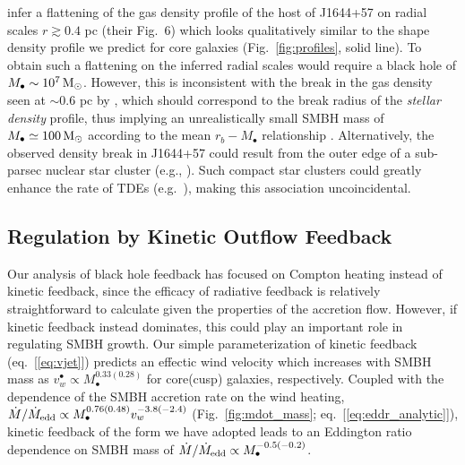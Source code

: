 \documentclass[usenatbib,fleqn]{mn2e}
\newcommand{\Mbh}[1][]{M_{\bullet#1}}
\begin{document}
\citet{BergerZauderer+:2012a} infer a flattening of the gas density
profile of the host of J1644+57 on radial scales $r \gtrsim 0.4$ pc (their Fig.~6) which looks
qualitatively similar to the shape density profile we predict for core
galaxies (Fig.~\ref{fig:profiles}, solid line).  To obtain such a flattening on the inferred radial scales would require a black hole of $\Mbh\sim 10^7 \Msun$.  However,  this is inconsistent with the break in the gas density seen at $\sim 0.6$ pc by \citet{BergerZauderer+:2012a}, which should correspond to the break radius of the {\it stellar density} profile, thus implying an unrealistically small SMBH mass of $\Mbh\simeq 100\Msun$ according to the mean $r_b-M_{\bullet}$ relationship \citep{LauerFaber+:2007a}.  Alternatively, the observed density break in J1644+57 could result from the outer edge of a sub-parsec nuclear star cluster (e.g., \citealt{Carson+15}).  Such compact star clusters could greatly enhance the rate of TDEs (e.g.~\citealt{Stone&Metzger15}), making this association uncoincidental.


\subsection{Regulation by Kinetic Outflow Feedback}
\label{sec:kinetic}

Our analysis of black hole feedback has focused on Compton heating instead of kinetic feedback, since the efficacy of radiative feedback is relatively straightforward to calculate given the properties of the accretion flow.  However, if kinetic feedback instead dominates, this could play an important role in regulating SMBH growth.  Our simple parameterization of kinetic feedback (eq.~[\ref{eq:vjet}]) predicts an effectic wind velocity which increases with SMBH mass as $v_{w}^{\bullet} \propto M_{\bullet}^{0.33(0.28)}$ for core(cusp) galaxies, respectively.  Coupled with the dependence of the SMBH accretion rate on the wind heating, $\dot{M}/\dot{M}_{\rm edd} \propto M_{\bullet}^{0.76(0.48)}v_{w}^{-3.8(-2.4)}$
(Fig.~\ref{fig:mdot_mass}; eq.~[\ref{eq:eddr_analytic}]), kinetic feedback of the form we have adopted leads to an Eddington ratio dependence on SMBH mass of $\dot{M}/\dot{M}_{\rm edd} \propto M_{\bullet}^{-0.5(-0.2)}$.  
\end{document}
